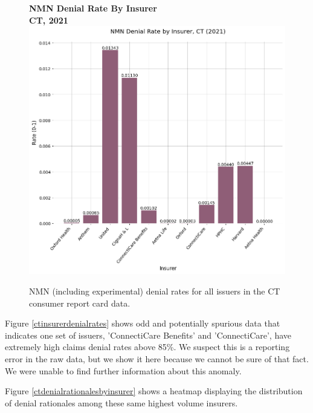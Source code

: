 \documentclass[12pt, a4paper,twoside,parskip=full]{report}
\theoremstyle{plain} %
\theoremstyle{definition} %
\theoremstyle{remark} %
\numberwithin{equation}{chapter}
\begin{document}
		\clearpage
		
		\begin{figure}[h!]
			\centering
			\textbf{NMN Denial Rate By Insurer}\\
			\textbf{CT, 2021}\\
			\includegraphics[width=\columnwidth]{images/ct_claims/nmn_denial_rate_by_insurer.png}
			\caption{NMN (including experimental) denial rates for all issuers in the CT consumer report card data.}
			\label{ctinsurernmndenialrates}
		\end{figure}
	
		Figure \ref{ctinsurerdenialrates} shows odd and potentially spurious data that indicates one set of issuers, 'ConnectiCare Benefits' and 'ConnectiCare', have extremely high claims denial rates above 85\%. We suspect this is a reporting error in the raw data, but we show it here because we cannot be sure of that fact. We were unable to find further information about this anomaly.
		
		Figure \ref{ctdenialrationalesbyinsurer} shows a heatmap displaying the distribution of denial rationales among these same highest volume insurers.
\end{document}
